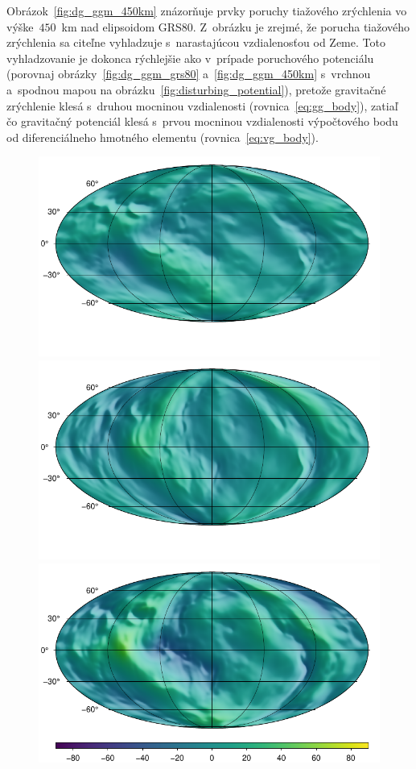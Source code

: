 \documentclass[a4paper, 12pt]{book}
\begin{document}
Obrázok~\ref{fig:dg_ggm_450km} znázorňuje prvky poruchy tiažového zrýchlenia vo 
výške~$450$~km nad elipsoidom GRS80.  Z~obrázku je zrejmé, že porucha tiažového 
zrýchlenia sa citeľne vyhladzuje s~narastajúcou vzdialenosťou od Zeme.  Toto 
vyhladzovanie je dokonca rýchlejšie ako v~prípade poruchového potenciálu 
(porovnaj obrázky~\ref{fig:dg_ggm_grs80} a~\ref{fig:dg_ggm_450km} s~vrchnou 
a~spodnou mapou na obrázku~\ref{fig:disturbing_potential}), pretože gravitačné 
zrýchlenie klesá s~druhou mocninou vzdialenosti (rovnica~\ref{eq:gg_body}), 
zatiaľ čo gravitačný potenciál klesá s~prvou mocninou vzdialenosti výpočtového 
bodu od diferenciálneho hmotného elementu (rovnica~\ref{eq:vg_body}).

\begin{figure}
\centering
\includegraphics{./fig-gravity-disturbance-at-450km-x.pdf}
\includegraphics{./fig-gravity-disturbance-at-450km-y.pdf}
\includegraphics{./fig-gravity-disturbance-at-450km-z.pdf}

\end{figure}
\end{document}
